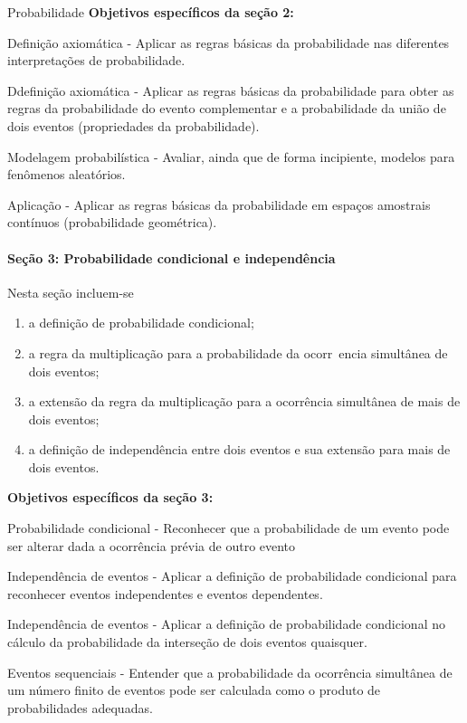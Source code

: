 \begin{apresentacao}{Probabilidade}
\textbf{Objetivos específicos da seção 2:}
\begin{OES}\setcounter{enumi}{5}
\item Definição axiomática - Aplicar as regras básicas da probabilidade nas diferentes interpretações de probabilidade.
\item  Ddefinição axiomática - Aplicar as regras básicas da probabilidade para obter as regras da probabilidade do evento complementar e a probabilidade da união de dois eventos (propriedades da probabilidade).
\item  Modelagem probabilística - Avaliar, ainda que de forma incipiente, modelos para fenômenos aleatórios.
\item  Aplicação - Aplicar as regras básicas da probabilidade em espaços amostrais contínuos (probabilidade geométrica).
\end{OES}

\paragraph{Seção 3: Probabilidade condicional e independência}
Nesta seção incluem-se
\begin{enumerate}
\item a definição de probabilidade condicional;
\item a regra da multiplicação para a probabilidade da ocorr~encia simultânea de dois eventos;
\item a extensão da regra da multiplicação para a ocorrência simultânea de mais de dois eventos;
\item a definição de independência entre dois eventos e sua extensão para mais de dois eventos.
\end{enumerate}

\textbf{Objetivos específicos da seção 3:}
\begin{OES}\setcounter{enumi}{9}
\item Probabilidade condicional - Reconhecer que a probabilidade de um evento pode ser alterar dada a ocorrência prévia de outro evento
\item Independência de eventos - Aplicar a definição de probabilidade condicional para reconhecer eventos independentes e eventos dependentes.
\item Independência de eventos - Aplicar a definição de probabilidade condicional no cálculo da probabilidade da interseção de dois eventos quaisquer.
\item Eventos sequenciais - Entender que a probabilidade da ocorrência simultânea de um número finito de eventos pode ser calculada como o produto de probabilidades adequadas.
\end{OES}


\end{apresentacao}
